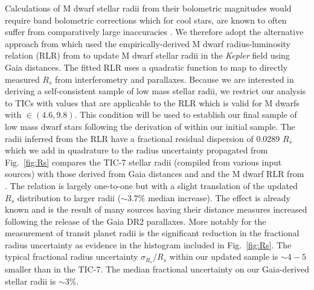 Calculations of M dwarf stellar radii from their bolometric magnitudes would require \Ks{-}band bolometric
corrections which for cool stars, are known to often suffer from comparatively large inaccuracies 
\citep[\teff{} $\lesssim 4100$ K;][]{berger18}. We therefore adopt the alternative approach from
\cite{berger18} which used the empirically-derived M dwarf radius-luminosity relation (RLR) from
\cite{mann15} to update M dwarf stellar radii in the \emph{Kepler} field using Gaia distances.
The fitted RLR uses a quadratic function to map
\MK{} to directly measured $R_s$ from interferometry and parallaxes. Because we are interested in deriving a
self-consistent sample of low mass stellar radii, we restrict our
analysis to TICs with \MK{} values that are applicable to the \cite{mann15} RLR which
is valid for M dwarfs with \MK{} $\in (4.6,9.8)$. This condition will be used to establish our final
sample of low mass dwarf stars following the derivation of \teff{} within our initial sample.
The radii inferred from the RLR have a fractional residual dispersion of 0.0289 $R_s$ which we add
in quadrature to the radius uncertainty propagated from   \\

Fig.~\ref{fig:Rs} compares the TIC-7 stellar radii (compiled from various input sources) with those
derived from Gaia distances and and the M dwarf RLR from \cite{mann15}. The relation is largely one-to-one
but with a slight translation of the updated $R_s$ distribution to larger radii ($\sim 3.7$\% median increase).
The effect is already known \citep{berger18} and is the result of many sources having their distance
measures increased following the release of the Gaia DR2 parallaxes. More notably for the measurement of
transit planet radii is the significant reduction in the fractional radius uncertainty as evidence in the
histogram included in Fig.~\ref{fig:Rs}. The typical fractional radius uncertainty $\sigma_{R_{s}}/R_s$ within
our updated sample is $\sim 4-5$ smaller than in the TIC-7. The median fractional uncertainty on our
Gaia-derived stellar radii is $\sim 3$\%.

